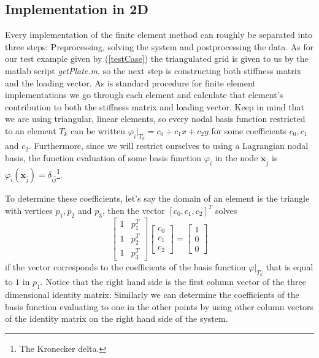 \documentclass[paper=a4, fontsize=11pt]{scrartcl} %
\begin{document}
\subsection*{Implementation in 2D}
Every implementation of the finite element method can roughly be separated into three steps: Preprocessing, solving the system and postprocessing the data. As for our test example given by (\ref{testCase}) the triangulated grid is given to us by the matlab script \textit{getPlate.m}, so the next step is constructing both stiffness matrix and the loading vector. As is standard procedure for finite element implementations we go through each element and calculate that element's contribution to both the stiffness matrix and loading vector.  Keep in mind that we are using triangular, linear elements, so every nodal basis function restricted to an element $T_k$ can be written $\varphi_{\hat{i}}\big|_{T_k} = c_0 + c_1x+c_2y$ for some coefficients $c_0,c_1$ and $c_2$. Furthermore, since we will restrict ourselves to using a Lagrangian nodal basis, the function evaluation of some basis function $\varphi_{\hat{i}}$ in the node $\textbf{x}_{\hat{j}}$ is $\varphi_{\hat{i}}(\textbf{x}_{\hat{j}}) = \delta_{\hat{i}\hat{j}}$\footnote{The Kronecker delta.}.

To determine these coefficients, let's say the domain of an element is the triangle with vertices $p_1, p_2$ and $p_3$, then the vector $[c_0, c_1, c_2]^T$ solves
\begin{equation*}
\begin{bmatrix}
1 & p_1^T \\
1 & p_2^T \\
1 & p_3^T
\end{bmatrix}
\begin{bmatrix}
c_0 \\ c_1 \\ c_2
\end{bmatrix}
= \begin{bmatrix}
1 \\ 0 \\ 0
\end{bmatrix}
\end{equation*}
if the vector corresponds to the coefficients of the basis function $\varphi\big|_{T_k}$ that is equal to $1$ in $p_1$. Notice that the right hand side is the first column vector of the three dimensional identity matrix. Similarly we can determine the coefficients of the basis function evaluating to one in the other points by using other column vectors of the identity matrix on the right hand side of the system.
\end{document}
